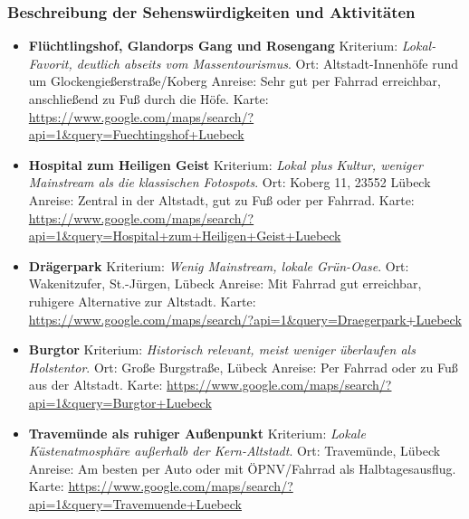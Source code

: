 \documentclass[a4paper,12pt]{article}
\begin{document}
\subsubsection{Beschreibung der Sehenswürdigkeiten und Aktivitäten}
\begin{itemize}
\item \textbf{Flüchtlingshof, Glandorps Gang und Rosengang}\newline
Kriterium: \textit{Lokal-Favorit, deutlich abseits vom Massentourismus}.\newline
Ort: Altstadt-Innenhöfe rund um Glockengießerstraße/Koberg\newline
Anreise: Sehr gut per Fahrrad erreichbar, anschließend zu Fuß durch die Höfe.\newline
Karte: \url{https://www.google.com/maps/search/?api=1&query=Fuechtingshof+Luebeck}

\item \textbf{Hospital zum Heiligen Geist}\newline
Kriterium: \textit{Lokal plus Kultur, weniger Mainstream als die klassischen Fotospots}.\newline
Ort: Koberg 11, 23552 Lübeck\newline
Anreise: Zentral in der Altstadt, gut zu Fuß oder per Fahrrad.\newline
Karte: \url{https://www.google.com/maps/search/?api=1&query=Hospital+zum+Heiligen+Geist+Luebeck}

\item \textbf{Drägerpark}\newline
Kriterium: \textit{Wenig Mainstream, lokale Grün-Oase}.\newline
Ort: Wakenitzufer, St.-Jürgen, Lübeck\newline
Anreise: Mit Fahrrad gut erreichbar, ruhigere Alternative zur Altstadt.\newline
Karte: \url{https://www.google.com/maps/search/?api=1&query=Draegerpark+Luebeck}

\item \textbf{Burgtor}\newline
Kriterium: \textit{Historisch relevant, meist weniger überlaufen als Holstentor}.\newline
Ort: Große Burgstraße, Lübeck\newline
Anreise: Per Fahrrad oder zu Fuß aus der Altstadt.\newline
Karte: \url{https://www.google.com/maps/search/?api=1&query=Burgtor+Luebeck}

\item \textbf{Travemünde als ruhiger Außenpunkt}\newline
Kriterium: \textit{Lokale Küstenatmosphäre außerhalb der Kern-Altstadt}.\newline
Ort: Travemünde, Lübeck\newline
Anreise: Am besten per Auto oder mit ÖPNV/Fahrrad als Halbtagesausflug.\newline
Karte: \url{https://www.google.com/maps/search/?api=1&query=Travemuende+Luebeck}
\end{itemize}
\end{document}
